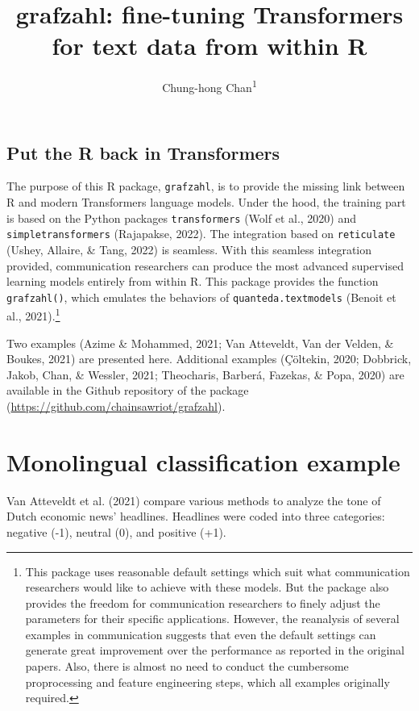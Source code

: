 \documentclass[
  english,
  man,floatsintext]{apa7}
\title{grafzahl: fine-tuning Transformers for text data from within R}
\author{Chung-hong Chan\textsuperscript{1}}
\date{}
\affiliation{\vspace{0.5cm}\textsuperscript{1} GESIS - Leibniz-Institut für Sozialwissenschaften, Germany}
\begin{document}
\maketitle

\hypertarget{put-the-r-back-in-transformers}{%
\subsection{Put the R back in Transformers}\label{put-the-r-back-in-transformers}}

The purpose of this R package, \texttt{grafzahl}, is to provide the missing link between R and modern Transformers language models. Under the hood, the training part is based on the Python packages \texttt{transformers} (Wolf et al., 2020) and \texttt{simpletransformers} (Rajapakse, 2022). The integration based on \texttt{reticulate} (Ushey, Allaire, \& Tang, 2022) is seamless. With this seamless integration provided, communication researchers can produce the most advanced supervised learning models entirely from within R. This package provides the function \texttt{grafzahl()}, which emulates the behaviors of \texttt{quanteda.textmodels} (Benoit et al., 2021).\footnote{This package uses reasonable default settings which suit what communication researchers would like to achieve with these models. But the package also provides the freedom for communication researchers to finely adjust the parameters for their specific applications. However, the reanalysis of several examples in communication suggests that even the default settings can generate great improvement over the performance as reported in the original papers. Also, there is almost no need to conduct the cumbersome proprocessing and feature engineering steps, which all examples originally required.}

Two examples (Azime \& Mohammed, 2021; Van Atteveldt, Van der Velden, \& Boukes, 2021) are presented here. Additional examples (Çöltekin, 2020; Dobbrick, Jakob, Chan, \& Wessler, 2021; Theocharis, Barberá, Fazekas, \& Popa, 2020) are available in the Github repository of the package (\url{https://github.com/chainsawriot/grafzahl}).

\hypertarget{monolingual-classification-example}{%
\section{Monolingual classification example}\label{monolingual-classification-example}}

Van Atteveldt et al. (2021) compare various methods to analyze the tone of Dutch economic news' headlines. Headlines were coded into three categories: negative (-1), neutral (0), and positive (+1).
\end{document}
